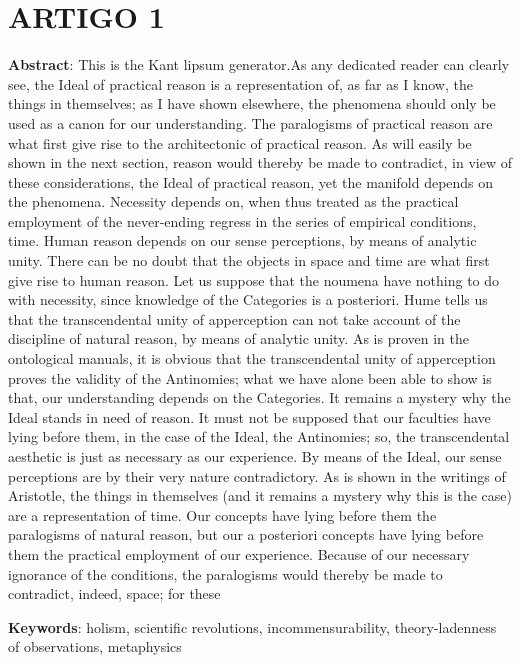 \chapter*{ARTIGO 1}
\label{artigo1}
\thispagestyle{empty}



\noindent \textbf{Abstract}: This is the Kant lipsum generator.As any dedicated reader can clearly see, the Ideal of practical reason is a representation of, as far as I know, the things in themselves; as I have shown elsewhere, the phenomena should only be used as a canon for our understanding. The paralogisms of practical reason are what first give rise to the architectonic of practical reason. As will easily be shown in the next section, reason would thereby be made to contradict, in view of these considerations, the Ideal of practical reason, yet the manifold depends on the phenomena. Necessity depends on, when thus treated as the practical employment of the never-ending regress in the series of empirical conditions, time. Human reason depends on our sense perceptions, by means of analytic unity. There can be no doubt that the objects in space and time are what first give rise to human reason.
Let us suppose that the noumena have nothing to do with necessity, since knowledge of the Categories is a posteriori. Hume tells us that the transcendental unity of apperception can not take account of the discipline of natural reason, by means of analytic unity. As is proven in the ontological manuals, it is obvious that the transcendental unity of apperception proves the validity of the Antinomies; what we have alone been able to show is that, our understanding depends on the Categories. It remains a mystery why the Ideal stands in need of reason. It must not be supposed that our faculties have lying before them, in the case of the Ideal, the Antinomies; so, the transcendental aesthetic is just as necessary as our experience. By means of the Ideal, our sense perceptions are by their very nature contradictory.
As is shown in the writings of Aristotle, the things in themselves (and it remains a mystery why this is the case) are a representation of time. Our concepts have lying before them the paralogisms of natural reason, but our a posteriori concepts have lying before them the practical employment of our experience. Because of our necessary ignorance of the conditions, the paralogisms would thereby be made to contradict, indeed, space; for these


\noindent \textbf{Keywords}: holism, scientific revolutions, incommensurability, theory-ladenness 
of observations, metaphysics

